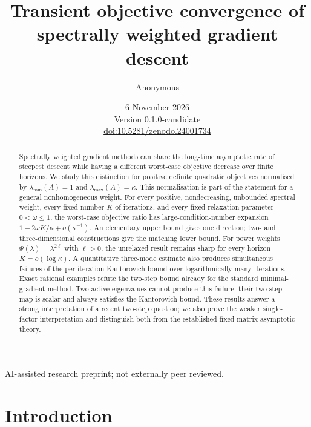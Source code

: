 \documentclass[11pt,a4paper]{article}
\title{Transient objective convergence of spectrally weighted gradient descent}
\author{Anonymous}
\date{6 November 2026\\\small Version 0.1.0-candidate\\\href{https://doi.org/10.5281/zenodo.24001734}{doi:10.5281/zenodo.24001734}}
\theoremstyle{remark}
\begin{document}
\maketitle
\begin{center}\small AI-assisted research preprint; not externally peer reviewed.\end{center}

\begin{abstract}
Spectrally weighted gradient methods can share the long-time asymptotic rate of steepest descent while having a different worst-case objective decrease over finite horizons. We study this distinction for positive definite quadratic objectives normalised by $\lambda_{\min}(A)=1$ and $\lambda_{\max}(A)=\kappa$. This normalisation is part of the statement for a general nonhomogeneous weight. For every positive, nondecreasing, unbounded spectral weight, every fixed number $K$ of iterations, and every fixed relaxation parameter $0<\omega\le1$, the worst-case objective ratio has large-condition-number expansion $1-2\omega K/\kappa+o(\kappa^{-1})$. An elementary upper bound gives one direction; two- and three-dimensional constructions give the matching lower bound. For power weights $\Psi(\lambda)=\lambda^{2\ell}$ with $\ell>0$, the unrelaxed result remains sharp for every horizon $K=o(\log\kappa)$. A quantitative three-mode estimate also produces simultaneous failures of the per-iteration Kantorovich bound over logarithmically many iterations. Exact rational examples refute the two-step bound already for the standard minimal-gradient method. Two active eigenvalues cannot produce this failure: their two-step map is scalar and always satisfies the Kantorovich bound. These results answer a strong interpretation of a recent two-step question; we also prove the weaker single-factor interpretation and distinguish both from the established fixed-matrix asymptotic theory.
\end{abstract}

\section{Introduction}
\end{document}
